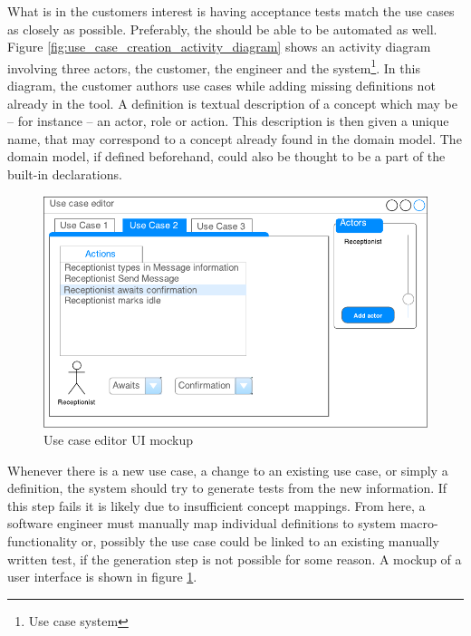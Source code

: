 \documentclass[10pt]{scrreprt}
\begin{document}
What is in the customers interest is having acceptance tests match the use cases as closely as possible. Preferably, the should be able to be automated as well. Figure \ref{fig:use_case_creation_activity_diagram} shows an activity diagram involving three actors, the customer, the engineer and the system\footnote{Use case system}. In this diagram, the customer authors use cases while adding missing definitions not already in the tool. A definition is textual description of a concept which may be -- for instance -- an actor, role or action. This description is then given a unique name, that may correspond to a concept already found in the domain model. The domain model, if defined beforehand, could also be thought to be a part of the built-in declarations.

\begin{figure}[h]
\includegraphics[scale=0.9]{img/test_case_ui}
\centering
\caption{Use case editor UI mockup}
\label{fig:use_case_editor_mockup}
\end{figure}

Whenever there is a new use case, a change to an existing use case, or simply a definition, the system should try to generate tests from the new information. If this step fails it is likely due to insufficient concept mappings. From here, a software engineer must manually map individual definitions to system macro-functionality or, possibly the use case could be linked to an existing manually written test, if the generation step is not possible for some reason. A mockup of a user interface is shown in figure \ref{fig:use_case_editor_mockup}.

\end{document}
